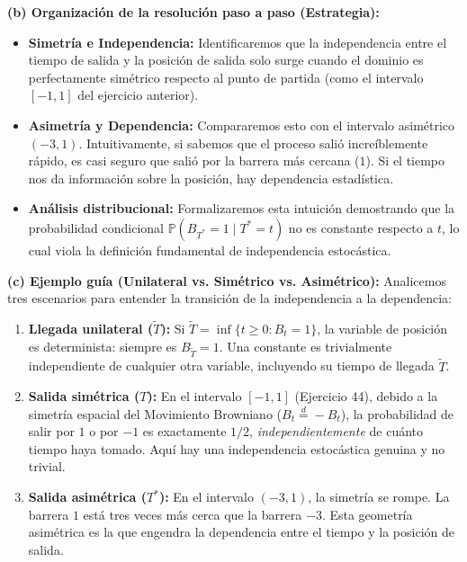 \documentclass[11pt, letterpaper]{article}
\begin{document}
\begin{solucion}
    \textbf{(b) Organización de la resolución paso a paso (Estrategia):}
    \begin{itemize}
        \item[(i)] \textbf{Simetría e Independencia:} Identificaremos que la independencia entre el tiempo de salida y la posición de salida solo surge cuando el dominio es perfectamente simétrico respecto al punto de partida (como el intervalo $[-1, 1]$ del ejercicio anterior).
        \item[(ii)] \textbf{Asimetría y Dependencia:} Compararemos esto con el intervalo asimétrico $(-3, 1)$. Intuitivamente, si sabemos que el proceso salió increíblemente rápido, es casi seguro que salió por la barrera más cercana ($1$). Si el tiempo nos da información sobre la posición, hay dependencia estadística.
        \item[(iii)] \textbf{Análisis distribucional:} Formalizaremos esta intuición demostrando que la probabilidad condicional $\mathbb{P}(B_{T^*} = 1 \mid T^* = t)$ no es constante respecto a $t$, lo cual viola la definición fundamental de independencia estocástica.
    \end{itemize}

    \vspace{3mm}
    \textbf{(c) Ejemplo guía (Unilateral vs. Simétrico vs. Asimétrico):}
    Analicemos tres escenarios para entender la transición de la independencia a la dependencia:
    \begin{enumerate}
        \item \textbf{Llegada unilateral ($\tilde{T}$):} Si $\tilde{T} = \inf\{t \ge 0 : B_t = 1\}$, la variable de posición es determinista: siempre es $B_{\tilde{T}} = 1$. Una constante es trivialmente independiente de cualquier otra variable, incluyendo su tiempo de llegada $\tilde{T}$.
        \item \textbf{Salida simétrica ($T$):} En el intervalo $[-1, 1]$ (Ejercicio 44), debido a la simetría espacial del Movimiento Browniano ($B_t \stackrel{d}{=} -B_t$), la probabilidad de salir por $1$ o por $-1$ es exactamente $1/2$, \textit{independientemente} de cuánto tiempo haya tomado. Aquí hay una independencia estocástica genuina y no trivial.
        \item \textbf{Salida asimétrica ($T^*$):} En el intervalo $(-3, 1)$, la simetría se rompe. La barrera $1$ está tres veces más cerca que la barrera $-3$. Esta geometría asimétrica es la que engendra la dependencia entre el tiempo y la posición de salida.
    \end{enumerate}


\end{solucion}
\end{document}
